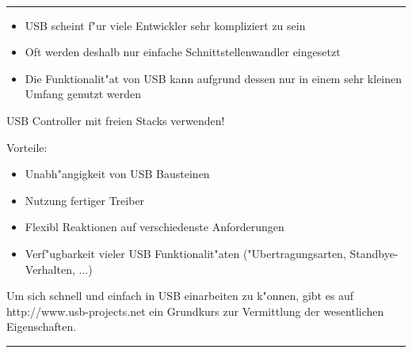 \documentclass[11pt]{article}
\begin{document}
\begin{minipage}[t]{7cm}
\hfill {\Large{}}\\
\hrule
{}

\bigskip

\begin{itemize}
\item USB scheint f"ur viele Entwickler sehr kompliziert zu sein 
\item Oft werden deshalb nur einfache Schnittstellenwandler eingesetzt
\item Die Funktionalit"at von USB kann aufgrund dessen nur in einem sehr kleinen Umfang genutzt werden 
\end{itemize}

\medskip


\begin{center}
  {\large USB Controller mit freien Stacks verwenden!}
\end{center}

Vorteile:

\begin{itemize}
\item Unabh"angigkeit von USB Bausteinen
\item Nutzung fertiger Treiber
\item Flexibl Reaktionen auf verschiedenste Anforderungen
\item Verf"ugbarkeit vieler USB Funktionalit"aten ("Ubertragungsarten, Standbye-Verhalten, ...) 
\end{itemize}

Um sich schnell und einfach in USB einarbeiten zu k"onnen,
gibt es auf http://www.usb-projects.net ein
Grundkurs zur Vermittlung der wesentlichen Eigenschaften.


\end{minipage}
\hskip 12mm
\rule[-18.8cm]{0.2pt}{5mm}  %
\hskip 12mm
\end{document}
